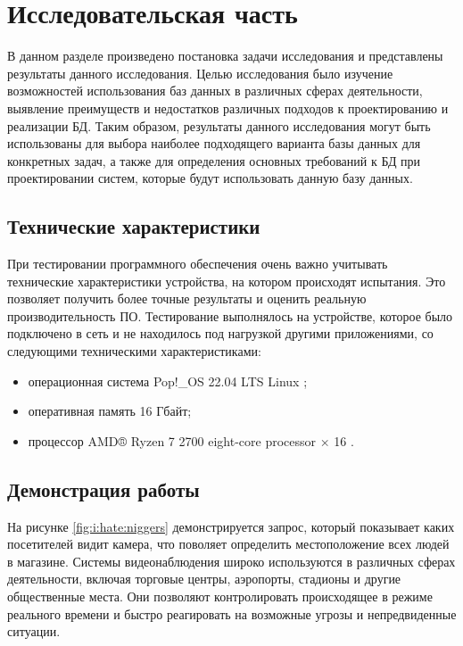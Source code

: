 \section{\large Исследовательская часть}

В данном разделе произведено постановка задачи исследования и представлены
результаты данного исследования.
Целью исследования было изучение возможностей использования баз данных в различных сферах деятельности, выявление преимуществ и недостатков различных подходов к проектированию и реализации БД.
Таким образом, результаты данного исследования могут быть использованы для выбора наиболее подходящего варианта базы данных для конкретных задач, а также для определения основных требований к БД при проектировании систем, которые будут использовать данную базу данных.

\subsection{Технические характеристики}

При тестировании программного обеспечения очень важно учитывать технические характеристики устройства, на котором происходят испытания. Это позволяет получить более точные результаты и оценить реальную производительность ПО.
Тестирование выполнялось на устройстве, которое было подключено в сеть и не находилось под нагрузкой другими приложениями, со следующими техническими
характеристиками:
\begin{itemize}
	\item операционная система Pop!\_OS 22.04 LTS \cite{popos} Linux
	      \cite{Linux};
	\item оперативная память 16 Гбайт;
	\item процессор AMD® Ryzen 7 2700 eight-core processor × 16 \cite{amd}.
\end{itemize}

\subsection{Демонстрация работы}

На рисунке \ref{fig:i:hate:niggers} демонстрируется запрос, который показывает каких посетителей видит камера, что поволяет определить местоположение всех людей в магазине.
Системы видеонаблюдения широко используются в различных сферах деятельности, включая торговые центры, аэропорты, стадионы и другие общественные места. 
Они позволяют контролировать происходящее в режиме реального времени и быстро реагировать на возможные угрозы и непредвиденные ситуации.


